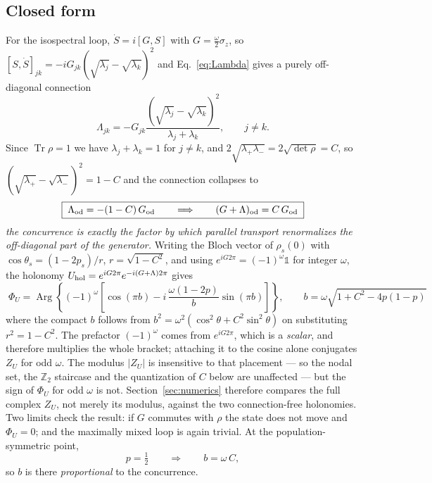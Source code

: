 \documentclass[11pt]{article}
\newcommand{\Tr}{\operatorname{Tr}}
\newcommand{\Arg}{\operatorname{Arg}}
\begin{document}
\subsection{Closed form}

For the isospectral loop, $\dot S=i[G,S]$ with $G=\frac{\omega}{2}\sigma_z$,
so $[S,\dot S]_{jk}=-iG_{jk}(\sqrt{\lambda_j}-\sqrt{\lambda_k})^2$ and
Eq.~\eqref{eq:Lambda} gives a purely off-diagonal connection
\begin{equation}
\Lambda_{jk}=-G_{jk}\frac{(\sqrt{\lambda_j}-\sqrt{\lambda_k})^2}{\lambda_j+\lambda_k},
\qquad j\neq k .
\end{equation}
Since $\Tr\rho=1$ we have $\lambda_j+\lambda_k=1$ for $j\neq k$, and
$2\sqrt{\lambda_+\lambda_-}=2\sqrt{\det\rho}=C$, so
$(\sqrt{\lambda_+}-\sqrt{\lambda_-})^2=1-C$ and the connection collapses to
\begin{equation}
\boxed{\;\Lambda_{\rm od}=-(1-C)\,G_{\rm od}
\qquad\Longrightarrow\qquad
(G+\Lambda)_{\rm od}=C\,G_{\rm od}\;}
\label{eq:GLambda}
\end{equation}
\emph{the concurrence is exactly the factor by which parallel transport
renormalizes the off-diagonal part of the generator.} Writing the Bloch vector
of $\rho_s(0)$ with $\cos\theta_s=(1-2p_s)/r$, $r=\sqrt{1-C^2}$, and using
$e^{iG2\pi}=(-1)^\omega\mathbb 1$ for integer $\omega$, the holonomy
$U_{\rm hol}=e^{iG2\pi}e^{-i(G+\Lambda)2\pi}$ gives
\begin{equation}
\boxed{\;
\Phi_U=\Arg\left\{(-1)^{\omega}\left[\cos(\pi b)
-i\,\frac{\omega(1-2p)}{b}\sin(\pi b)\right]\right\},
\qquad
b=\omega\sqrt{1+C^2-4p(1-p)}\;}
\label{eq:phiU}
\end{equation}
where the compact $b$ follows from
$b^2=\omega^2(\cos^2\theta+C^2\sin^2\theta)$ on substituting $r^2=1-C^2$. The
prefactor $(-1)^\omega$ comes from $e^{iG2\pi}$, which is a \emph{scalar}, and
therefore multiplies the whole bracket; attaching it to the cosine alone
conjugates $Z_U$ for odd $\omega$. The modulus $|Z_U|$ is insensitive to that
placement --- so the nodal set, the $\mathbb Z_2$ staircase and the
quantization of $C$ below are unaffected --- but the sign of $\Phi_U$ for odd
$\omega$ is not. Section~\ref{sec:numerics} therefore compares the full complex
$Z_U$, not merely its modulus, against the two connection-free holonomies. Two
limits check the result: if $G$ commutes with $\rho$ the state does not move
and $\Phi_U=0$; and the maximally mixed loop is again trivial. At the
population-symmetric point,
\begin{equation}
p=\tfrac12\qquad\Longrightarrow\qquad b=\omega\,C ,
\label{eq:b-half}
\end{equation}
so $b$ is there \emph{proportional} to the concurrence.
\end{document}
